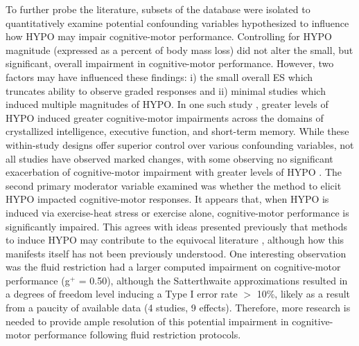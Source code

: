 To further probe the literature, subsets of the database were isolated to quantitatively examine potential confounding variables hypothesized to influence how HYPO may impair cognitive-motor performance. Controlling for HYPO magnitude (expressed as a percent of body mass loss) did not alter the small, but significant, overall impairment in cognitive-motor performance. However, two factors may have influenced these findings: i) the small overall ES which truncates ability to observe graded responses and ii) minimal studies which induced multiple magnitudes of HYPO. In one such study \cite{gopinathan_role_1988}, greater levels of HYPO induced greater cognitive-motor impairments across the domains of crystallized intelligence, executive function, and short-term memory. While these within-study designs offer superior control over various confounding variables, not all studies have observed marked changes, with some observing no significant exacerbation of cognitive-motor impairment with greater levels of HYPO \cite{weber_dehydration_2013, baker_dehydration_2007}. The second primary moderator variable examined was whether the method to elicit HYPO impacted cognitive-motor responses. It appears that, when HYPO is induced via exercise-heat stress or exercise alone, cognitive-motor performance is significantly impaired. This agrees with ideas presented previously that methods to induce HYPO may contribute to the equivocal literature \cite{lieberman_methods_2012}, although how this manifests itself has not been previously understood. One interesting observation was the fluid restriction had a larger computed impairment on cognitive-motor performance (g${^+}$ = 0.50), although the Satterthwaite approximations \cite{tipton_small_2015} resulted in a degrees of freedom level inducing a Type I error rate ${>}$ 10\%, likely as a result from a paucity of available data (4 studies, 9 effects). Therefore, more research is needed to provide ample resolution of this potential impairment in cognitive-motor performance following fluid restriction protocols.    

